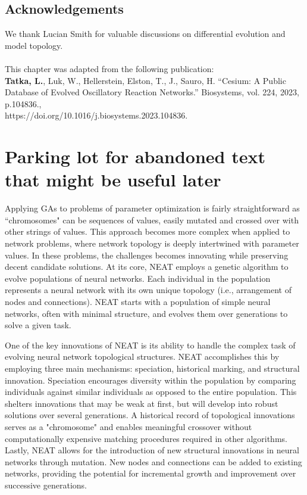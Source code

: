 \documentclass[12pt]{report}
\begin{document}
\section*{Acknowledgements}
We thank Lucian Smith for valuable discussions on differential evolution and model topology. 
\\
\\
This chapter was adapted from the following publication:
\\
\textbf{Tatka, L.}, Luk, W., Hellerstein, Elston, T., J., Sauro, H. “Cesium: A Public Database of Evolved Oscillatory Reaction Networks.”  Biosystems, vol. 224, 2023, p.104836., \\
https://doi.org/10.1016/j.biosystems.2023.104836. 
\\

\chapter{Parking lot for abandoned text that might be useful later}
Applying GAs to problems of parameter optimization is fairly straightforward as ``chromosomes" can be sequences of values, easily mutated and crossed over with other strings of values. This approach becomes more complex when applied to network problems, where network topology is deeply intertwined with parameter values. In these problems, the challenges becomes innovating while preserving decent candidate solutions. 
At its core, NEAT employs a genetic algorithm to evolve populations of neural networks. Each individual in the population represents a neural network with its own unique topology (i.e., arrangement of nodes and connections). NEAT starts with a population of simple neural networks, often with minimal structure, and evolves them over generations to solve a given task.

One of the key innovations of NEAT is its ability to handle the complex task of evolving neural network topological structures. NEAT accomplishes this by employing three main mechanisms: speciation, historical marking, and structural innovation. Speciation encourages diversity within the population by comparing individuals against similar individuals as opposed to the entire population. This shelters innovations that may be weak at first, but will develop into robust solutions over several generations. A historical record of topological innovations serves as a "chromosome" and enables meaningful crossover without computationally expensive matching procedures required in other algorithms. Lastly, NEAT allows for the introduction of new structural innovations in neural networks through mutation. New nodes and connections can be added to existing networks, providing the potential for incremental growth and improvement over successive generations.
\end{document}
